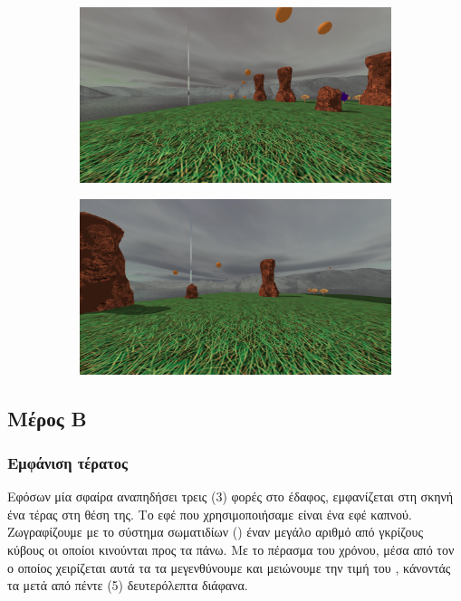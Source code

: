 \documentclass[11pt]{scrartcl} %
\newenvironment{centerimg}[1]%
{%
    \begin{figure}[H]
        #1
    \begin{center}
}%
{%
    \end{center}
    \end{figure}
}
\begin{document}
\begin{centerimg}{\caption{Η σκηνή με μπάλες να αναπηδάνε.}}
    \begin{subfigure}[b]{0.5\textwidth}
        \includegraphics[width=\textwidth]{./assets/balls_1.png}
    \end{subfigure}
    \begin{subfigure}[b]{0.5\textwidth}
        \includegraphics[width=\textwidth]{./assets/balls_2.png}
    \end{subfigure}
\end{centerimg}

\subsection{Μέρος Β}

\subsubsection{Εμφάνιση τέρατος}

Εφόσων μία σφαίρα αναπηδήσει τρεις (3) φορές στο έδαφος, εμφανίζεται στη σκηνή ένα τέρας στη θέση της. Το εφέ που 
χρησιμοποιήσαμε είναι ένα εφέ καπνού. Ζωγραφίζουμε με το σύστημα σωματιδίων () 
έναν μεγάλο αριθμό από γκρίζους κύβους οι οποίοι κινούνται προς τα πάνω. 
Με το πέρασμα του χρόνου, μέσα από τον  ο οποίος χειρίζεται αυτά τα  τα μεγενθύνουμε
και μειώνουμε την τιμή του , κάνοντάς τα μετά από πέντε (5) δευτερόλεπτα διάφανα. 
\end{document}
